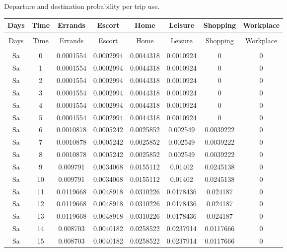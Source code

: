 \newpage
\begin{center}
    \begin{table}[h]
      \caption{Departure and destination probability per trip use.} 
    \end{table}
    \begin{longtable}{cccccccc}
    Days & Time & Errands & Escort & Home & Leisure & Shopping & Workplace \\ \hline
     & & & & & & & \\
    \endfirsthead
    Days & Time & Errands & Escort & Home & Leisure & Shopping & Workplace \\ \hline
     & & & & & & & \\
    \endhead
    \endfoot
    \endlastfoot
     Sa & 0 & 0.0001554 & 0.0002994 & 0.0044318 & 0.0010924 & 0 & 0 \\  
     Sa & 1 & 0.0001554 & 0.0002994 & 0.0044318 & 0.0010924 & 0 & 0 \\  
     Sa & 2 & 0.0001554 & 0.0002994 & 0.0044318 & 0.0010924 & 0 & 0 \\  
     Sa & 3 & 0.0001554 & 0.0002994 & 0.0044318 & 0.0010924 & 0 & 0 \\  
     Sa & 4 & 0.0001554 & 0.0002994 & 0.0044318 & 0.0010924 & 0 & 0 \\  
     Sa & 5 & 0.0001554 & 0.0002994 & 0.0044318 & 0.0010924 & 0 & 0 \\  
     Sa & 6 & 0.0010878 & 0.0005242 & 0.0025852 & 0.002549 & 0.0039222 & 0 \\  
     Sa & 7 & 0.0010878 & 0.0005242 & 0.0025852 & 0.002549 & 0.0039222 & 0 \\  
     Sa & 8 & 0.0010878 & 0.0005242 & 0.0025852 & 0.002549 & 0.0039222 & 0 \\  
     Sa & 9 & 0.009791 & 0.0034068 & 0.0155112 & 0.01402 & 0.0245138 & 0 \\  
     Sa & 10 & 0.009791 & 0.0034068 & 0.0155112 & 0.01402 & 0.0245138 & 0 \\  
     Sa & 11 & 0.0119668 & 0.0048918 & 0.0310226 & 0.0178436 & 0.024187 & 0 \\  
     Sa & 12 & 0.0119668 & 0.0048918 & 0.0310226 & 0.0178436 & 0.024187 & 0 \\  
     Sa & 13 & 0.0119668 & 0.0048918 & 0.0310226 & 0.0178436 & 0.024187 & 0 \\  
     Sa & 14 & 0.008703 & 0.0040182 & 0.0258522 & 0.0237914 & 0.0117666 & 0 \\  
     Sa & 15 & 0.008703 & 0.0040182 & 0.0258522 & 0.0237914 & 0.0117666 & 0 \\  

\end{longtable}
\end{center}
